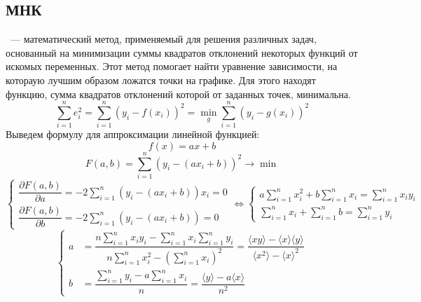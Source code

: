 \subsection{МНК}
~--- математический метод, применяемый для решения различных задач, основанный на минимизации суммы квадратов отклонений некоторых функций от искомых переменных. Этот метод помогает найти уравнение зависимости, на котораую лучшим образом ложатся точки на графике. Для этого находят функцию, сумма квадратов отклонений которой от заданных точек, минимальна.
\begin{equation}
\sum\limits_{i=1}^n e_i^2 = \sum\limits_{i=1}^n (y_i - f(x_i))^2 = \min_g \sum\limits_{i=1}^n (y_i - g(x_i))^2
\end{equation}
Выведем формулу для аппроксимации линейной функцией:
\begin{equation*}
f(x) = ax + b
\end{equation*}
\begin{equation*}
F(a,b) = \sum\limits_{i=1}^n(y_i-(ax_i + b))^2 \rightarrow \min 
\end{equation*}
\begin{equation*}
\left\{ \begin{array}{rcl}
\dfrac{\partial  F(a,b)}{\partial a} = -2\sum\limits_{i=1}^n(y_i-(ax_i + b))x_i = 0\\
\dfrac{\partial  F(a,b)}{\partial b} = -2\sum\limits_{i=1}^n(y_i-(ax_i + b)) = 0
\end{array} \right. \Longleftrightarrow
\left\{ \begin{array}{rcl}
a \sum\limits_{i=1}^n x_i^2 + b \sum\limits_{i=1}^n x_i = \sum\limits_{i=1}^n x_iy_i\\
 \sum\limits_{i=1}^n x_i + \sum\limits_{i=1}^n b = \sum\limits_{i=1}^n y_i
\end{array} \right.
\end{equation*}
\begin{equation*}
\left\{ \begin{array}{rcl}
a &= \dfrac{n\sum\limits_{i=1}^n x_i y_i - \sum\limits_{i=1}^n x_i \sum\limits_{i=1}^n y_i}{n \sum\limits_{i=1}^n x_i^2 - \left(\sum\limits_{i=1}^n x_i\right)^2} = \dfrac{\langle xy \rangle -\langle x\rangle \langle y \rangle}{\langle x^2 \rangle - \langle x \rangle^2}\\
b &= \dfrac{\sum\limits_{i=1}^n y_i - a \sum\limits_{i=1}^n x_i}{n} = \dfrac{\langle y \rangle - a \langle x \rangle}{n^2}
\end{array} \right.
\end{equation*}

